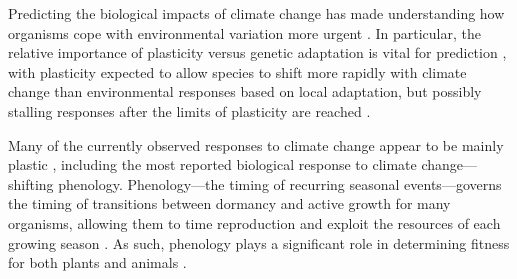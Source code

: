 \documentclass[12pt]{article}
\begin{document}
Predicting the biological impacts of climate change has made understanding how organisms cope with environmental variation more urgent \citep{botero15}. In particular, the relative importance of plasticity versus genetic adaptation is vital for prediction \citep{chevin10}, with plasticity expected to allow species to shift more rapidly with climate change than environmental responses based on local adaptation, but possibly stalling responses after the limits of plasticity are reached \citep{chevin102,snell18}.


Many of the currently observed responses to climate change appear to be mainly plastic \citep{burton22,zettle21,bonamour19, king17}, including the most reported biological response to climate change---shifting phenology. Phenology---the timing of recurring seasonal events---governs the timing of transitions between dormancy and active growth for many organisms, allowing them to time reproduction and exploit the resources of each growing season \citep{chuine10,hanninen11,rytteri21,posle18}. As such, phenology plays a significant role in determining fitness for both plants \citep{guo22,chuine01} and animals \citep{wann19,renner18,chu17}. 
\end{document}
